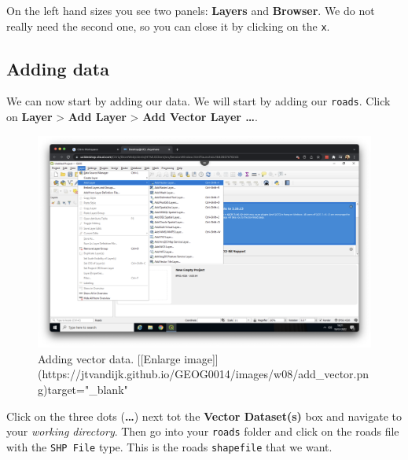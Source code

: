 \documentclass[
]{book}
\begin{document}
On the left hand sizes you see two panels: \textbf{Layers} and \textbf{Browser}. We do not really need the second one, so you can close it by clicking on the \texttt{x}.

\hypertarget{adding-data}{%
\subsection*{Adding data}\label{adding-data}}

We can now start by adding our data. We will start by adding our \texttt{roads}. Click on \textbf{Layer} \textgreater{} \textbf{Add Layer} \textgreater{} \textbf{Add Vector Layer \ldots{}}.

\begin{figure}

{\centering \includegraphics[width=850pt]{images/w08/add_vector} 

}

\caption{Adding vector data. [[Enlarge image]](https://jtvandijk.github.io/GEOG0014/images/w08/add_vector.png){target="_blank"}}\label{fig:add-vector}
\end{figure}

Click on the three dots (\textbf{\ldots{}}) next tot the \textbf{Vector Dataset(s)} box and navigate to your \emph{working directory}. Then go into your \texttt{roads} folder and click on the roads file with the \texttt{SHP\ File} type. This is the roads \texttt{shapefile} that we want.
\end{document}
